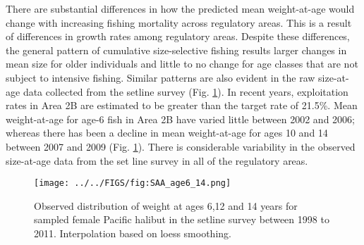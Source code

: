There are substantial differences in how the predicted mean weight-at-age would change with increasing fishing mortality across regulatory areas.  This is a result of differences in growth rates among regulatory areas.  Despite these differences, the general pattern of cumulative size-selective fishing results larger changes in mean size for older individuals and little to no change for age classes that are not subject to intensive fishing.  Similar patterns are also evident in the raw size-at-age data collected from the setline survey (Fig. \ref{fig:FIGS_fig:SAA_age6_14}).  In recent years, exploitation rates in Area 2B are estimated to be greater than the target rate of 21.5\%.  Mean weight-at-age for age-6 fish in Area 2B have varied little between 2002 and 2006; whereas there has been a decline in mean weight-at-age for ages 10 and 14 between 2007 and 2009 (Fig. \ref{fig:FIGS_fig:SAA_age6_14}).  There is considerable variability in the observed size-at-age data from the set line survey in all of the regulatory areas.

\begin{figure}[htbp]
	\centering
		\texttt{[image: ../../FIGS/fig:SAA\_age6\_14.png]}
	\caption{Observed distribution of weight at ages 6,12 and 14 years for sampled female Pacific halibut in the setline survey between 1998 to 2011. Interpolation based on loess smoothing.}
	\label{fig:FIGS_fig:SAA_age6_14}
\end{figure}






